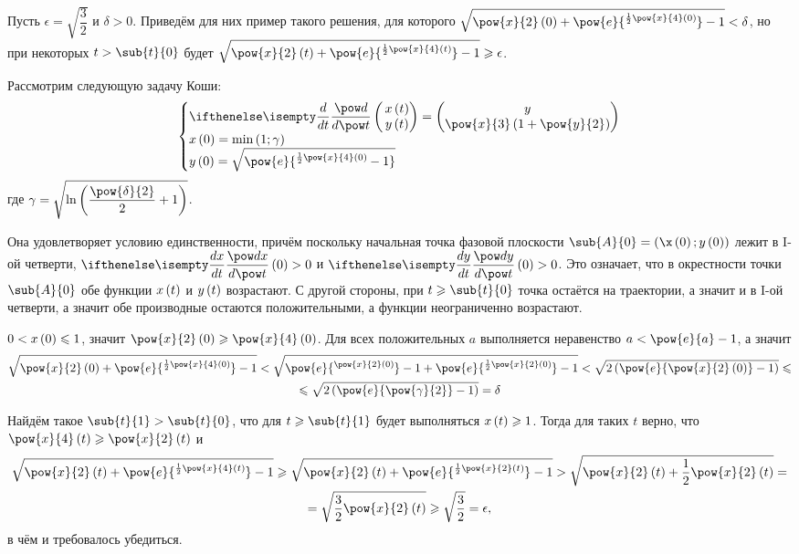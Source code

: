 \documentclass[a5paper,10pt]{article}
\begin{document}
Пусть $\epsilon = \sqrt{\dfrac {3} {2}}$ и $\delta > 0$.
Приведём для них пример такого решения, для которого 
$\sqrt{\pow{x}{2}\br{0} + \pow{e}{\selevate[0.4em]{\frac {1}{2} \pow{x}{4}\br{0}}} - 1} < \delta$,
но при некоторых $t > \sub{t}{0}$ будет 
$\sqrt{\pow{x}{2}\br{t} + \pow{e}{\selevate[0.4em]{\frac {1}{2} \pow{x}{4}\br{t}}} - 1} \ge \epsilon$.

Рассмотрим следующую задачу Коши:
$$\tsys{
    \der{}{t} \begin{pmatrix}\,x\br{t} \\ \,y\br{t}\end{pmatrix} 
        = \begin{pmatrix} y \\ \pow{x}{3} \br{1 + \pow{y}{2}} \end{pmatrix}
    \\ x\br{0} = \min\br{1; \gamma} 
    \\ y\br{0} = \sqrt{\pow{e}{\selevate[0.4em]{\frac {1}{2} \pow{x}{4}\br{0}} - 1}}
}$$
где $\gamma = \sqrt{\ln\br{\dfrac {\pow{\delta}{2}} {2} + 1}}$.

Она удовлетворяет условию единственности, причём поскольку начальная точка фазовой плоскости 
$\sub{A}{0} = \br{\x\br{0}; y\br{0}}$ лежит в I-ой четверти,
$\der{x}{t}\br{0} > 0$ и $\der{y}{t}\br{0} > 0$. 
Это означает, что в окрестности точки $\sub{A}{0}$ обе функции $x\left(\hspace{0.01em}t\hspace{0.01em}\right)$ и $y\left(\hspace{0.01em}t\hspace{0.01em}\right)$ возрастают.
С другой стороны, при $t \ge \sub{t}{0}$ точка остаётся на траектории, а значит и в I-ой четверти,
а значит обе производные остаются положительными, а функции неограниченно возрастают.

$0 < x\left(\hspace{0.01em}0\hspace{0.01em}\right) \leqslant 1$, значит $\pow{x}{2}\br{0} \ge \pow{x}{4}\br{0}$.
Для всех положительных $a$ выполняется неравенство $a < \pow{e}{a} - 1$, а значит
\begin{multline*}
    \sqrt{\pow{x}{2}\br{0} + \pow{e}{\selevate[0.4em]{\frac {1}{2} \pow{x}{4}\br{0}}} - 1}
    < \sqrt{\pow{e}{\selevate[0.4em]{\pow{x}{2}\br{0}}} - 1
        + \pow{e}{\selevate[0.4em]{\frac {1}{2} \pow{x}{2}\br{0}}} - 1}
    < \sqrt{2\br{\pow{e}{\pow{x}{2}\br{0}} - 1}} \le \\
    \le \sqrt{2\br{\pow{e}{\pow{\gamma}{2}} - 1}} = \delta
\end{multline*}

Найдём такое $\sub{t}{1} > \sub{t}{0}$, что для $t \ge \sub{t}{1}$ будет выполняться
$x\left(\hspace{0.01em}t\hspace{0.01em}\right) \geqslant 1$. Тогда для таких $t$ верно, что $\pow{x}{4}\br{t} \ge \pow{x}{2}\br{t}$ и
\begin{multline*}
    \sqrt{\pow{x}{2}\br{t} + \pow{e}{\selevate[0.4em]{\frac {1}{2} \pow{x}{4}\br{t}}} - 1}
    \ge \sqrt{\pow{x}{2}\br{t} + \pow{e}{\selevate[0.4em]{\frac {1}{2} \pow{x}{2}\br{t}}} - 1}
    > \sqrt{\pow{x}{2}\br{t} + \dfrac {1} {2} \pow{x}{2}\br{t}} = \\
    = \sqrt{\dfrac {3} {2} \pow{x}{2}\br{t}}
    \ge \sqrt{ \dfrac {3} {2} } = \epsilon,
\end{multline*}
в чём и требовалось убедиться. 
\end{document}
